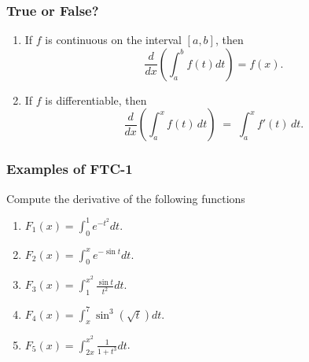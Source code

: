\documentclass[14pt]{beamer}
\newcommand{\setsize}[1]{\fontsize{#1}{#1}\selectfont} %
\newcommand{\smallerfont}{\setsize{13}} %
\begin{document}
	\begin{frame}[t]
		\smallerfont
		\frametitle{True or False?}

		\begin{enumerate}
			\item If $f$ is continuous on the interval $[a,b]$, then
				\[
					\frac{d}{dx}\left( \int_{a}^{b} f(t)dt\right)=f(x).
				\]

				\vspace{4mm}

			\item If $f$ is differentiable, then
				\[
					\frac{d}{dx}\left(\int_{a}^{x} f(t)\,dt \right) \; = \; \int_{a}^{x} f'
					(t) \,dt .
				\]
		\end{enumerate}
	\end{frame}

	\begin{frame}[t]
		\smallerfont
		\frametitle{Examples of FTC-1}

		Compute the derivative of the following functions

		\begin{enumerate}
			\item ${\displaystyle F_1(x) = \int_0^1 e^{-t^2} dt}$. \\
				\vfill

			\item ${\displaystyle F_2(x) = \int_0^x e^{-\sin t} dt}$. \\
				\vfill

			\item ${\displaystyle F_3(x) = \int_1^{x^2} \frac{\sin t}{t^{2}} dt}$. \\
				\vfill

			\item ${\displaystyle F_4(x) = \! \int_x^7 \sin^3 \! \! \left( \sqrt{t} \right) \! dt}$.
				\\
				\vfill

			\item ${\displaystyle F_5(x) = \int_{2x}^{x^2} \frac{1}{1+t^{3}} dt}$. \\
		\end{enumerate}
	\end{frame}
\end{document}
